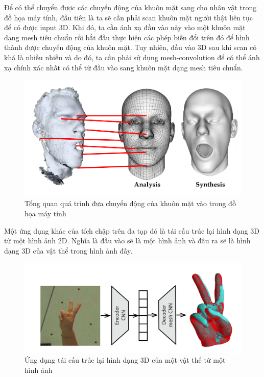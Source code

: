 Để có thể chuyển được các chuyển động của khuôn mặt sang cho nhân vật trong đồ họa máy tính, đầu tiên là ta sẽ cần phải scan khuôn mặt người thật liên tục để có được input 3D. Khi đó, ta cần ánh xạ đầu vào này vào một khuôn mặt dạng mesh tiêu chuẩn rồi bắt đầu thực hiện các phép biến đổi trên đó để hình thành được chuyển động của khuôn mặt. Tuy nhiên, đầu vào 3D sau khi scan có khá là nhiều nhiễu và do đó, ta cần phải sử dụng mesh-convolution để có thể ánh xạ chính xác nhất có thể từ đầu vào sang khuôn mặt dạng mesh tiêu chuẩn\cite{geometricdeep2022}.

\begin{figure}[H]
    \centering
    \includegraphics[width=1\linewidth]{Images/GDL/manifold_mesh/mani_cnn/computer_graphic.png}
    \caption{Tổng quan quá trình đưa chuyển động của khuôn mặt vào trong đồ họa máy tính\cite{geometricdeep2022}}
\end{figure}

Một ứng dụng khác của tích chập trên đa tạp đó là tái cấu trúc lại hình dạng 3D từ một hình ảnh 2D. Nghĩa là đầu vào sẽ là một hình ảnh và đầu ra sẽ là hình dạng 3D của vật thể trong hình ảnh đấy\cite{geometricdeep2022}.

\begin{figure}[H]
    \centering
    \includegraphics[width=1\linewidth]{Images/GDL/manifold_mesh/mani_cnn/3d_hand.png}
    \caption{Ứng dụng tái cấu trúc lại hình dạng 3D của một vật thể từ một hình ảnh\cite{geometricdeep2022}}
\end{figure}
